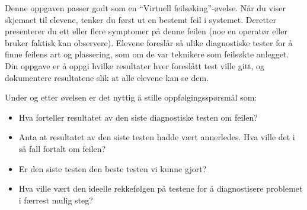 Denne oppgaven passer godt som en ``Virtuell feilsøking''-øvelse. Når du viser skjemaet til elevene, tenker du først ut en bestemt feil i systemet. Deretter presenterer du ett eller flere symptomer på denne feilen (noe en operatør eller bruker faktisk kan observere). Elevene foreslår så ulike diagnostiske tester for å finne feilens art og plassering, som om de var teknikere som feilsøkte anlegget. Din oppgave er å oppgi hvilke resultater hver foreslått test ville gitt, og dokumentere resultatene slik at alle elevene kan se dem.

Under og etter øvelsen er det nyttig å stille oppfølgingsspørsmål som:

\begin{itemize}
\item{} Hva forteller resultatet av den siste diagnostiske testen om feilen?
\item{} Anta at resultatet av den siste testen hadde vært annerledes. Hva ville det i så fall fortalt om feilen?
\item{} Er den siste testen den beste testen vi kunne gjort?
\item{} Hva ville vært den ideelle rekkefølgen på testene for å diagnostisere problemet i færrest mulig steg?
\end{itemize}




